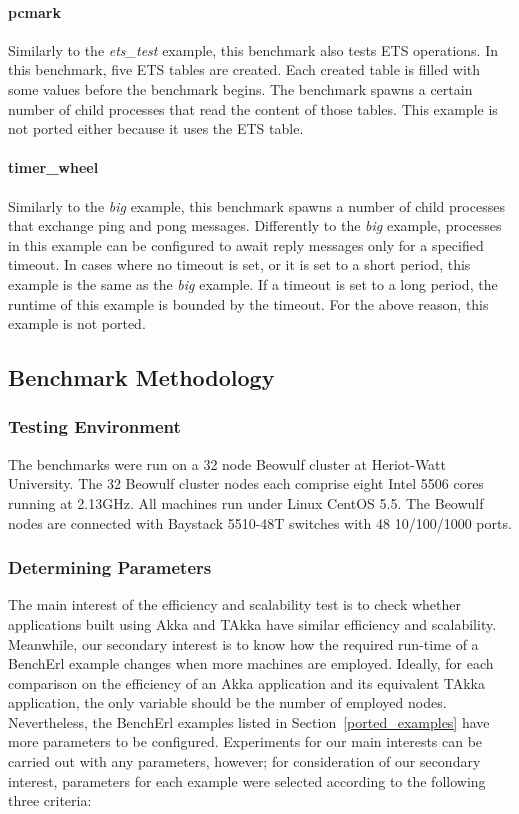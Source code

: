 \paragraph{pcmark} Similarly to the {\it ets\_test} example, this benchmark 
also tests ETS operations.  In this benchmark, five ETS tables are created. 
Each created table is filled with some values before the benchmark begins.  The 
benchmark spawns a certain number of child processes that read the content of 
those tables.  This example is not ported either because it uses the ETS table.


\paragraph{timer\_wheel} Similarly to the {\it big} example, this benchmark 
spawns a number of child processes that exchange ping and pong messages.  
Differently to the {\it big} example, processes in this example can be 
configured to await reply messages only for a specified timeout.  In cases where 
no timeout is set, or it is set to a short period, this example is the same 
as the {\it big} example.  If a timeout is set to a long period, the 
runtime of this example is bounded by the timeout.  For the above reason, this 
example is not ported.



\newpage


\subsection{Benchmark Methodology}
\subsubsection{Testing Environment}

The benchmarks were run on a 32 node Beowulf cluster at Heriot-Watt 
University.  The 32 Beowulf cluster nodes each comprise eight Intel 5506 cores 
running at 2.13GHz. All machines run under Linux CentOS 5.5. The Beowulf 
nodes are connected with Baystack 5510-48T switches with 48 10/100/1000 ports.

\subsubsection{Determining Parameters}
\label{bench_parameters}

The main interest of the efficiency and scalability test is to check whether 
applications built using Akka and TAkka have similar efficiency and 
scalability.  Meanwhile, our secondary interest is to know how 
the required run-time of a BenchErl example changes when more 
machines are employed.  Ideally, for each comparison on the efficiency of 
an Akka application and its equivalent TAkka application, the only variable 
should be the number of employed nodes.  Nevertheless, the BenchErl examples 
listed in Section~\ref{ported_examples} have more parameters to be configured.  
Experiments for our main interests can be carried out with any 
parameters, however; for consideration of our secondary interest, 
parameters for each example were selected according to the following three 
criteria:

